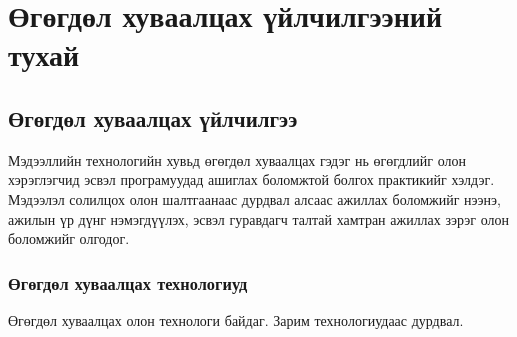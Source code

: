 
\chapter{Өгөгдөл хуваалцах үйлчилгээний тухай} %
\label{Chapter1} %
\pagecolor{white}

\newcommand{\keyword}[1]{\textbf{#1}}
\newcommand{\tabhead}[1]{\textbf{#1}}
\newcommand{\code}[1]{\texttt{#1}}
\newcommand{\file}[1]{\texttt{\bfseries#1}}
\newcommand{\option}[1]{\texttt{\itshape#1}}


\section{Өгөгдөл хуваалцах үйлчилгээ}
Мэдээллийн технологийн хувьд өгөгдөл хуваалцах гэдэг нь өгөгдлийг олон хэрэглэгчид эсвэл програмуудад ашиглах боломжтой болгох практикийг хэлдэг. Мэдээлэл солилцох олон шалтгаанаас дурдвал алсаас ажиллах боломжийг нээнэ, ажилын үр дүнг нэмэгдүүлэх, эсвэл гуравдагч талтай хамтран ажиллах зэрэг олон боломжийг олгодог.

\subsection{Өгөгдөл хуваалцах технологиуд}
Өгөгдөл хуваалцах олон технологи байдаг. Зарим технологиудаас дурдвал.

